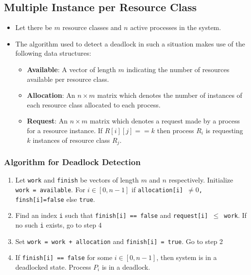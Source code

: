 \documentclass{article}
\theoremstyle{plain}
\theoremstyle{definition}
\begin{document}
\subsection{Multiple Instance per Resource Class}
\begin{itemize}
    \item Let there be $m$ resource classes and $n$ active processes in the system. 
    
    \item The algorithm used to detect a deadlock in such a situation makes use of the following data structures:
    \begin{itemize}
        \item \textbf{Available}: A vector of length $m$ indicating the number of resources available per resource class.
        
        \item \textbf{Allocation}: An $n \times m$ matrix which denotes the number of instances of each resource class allocated to each process. 
        
        \item \textbf{Request}: An $n \times m$ matrix which denotes a request made by a process for a resource instance. If $R[i][j] == k$ then process $R_i$ is requesting $k$ instances of resource class $R_j$. 
    \end{itemize}
\end{itemize}

\subsubsection{Algorithm for Deadlock Detection}
\begin{enumerate}
    \item Let \texttt{work} and \texttt{finish} be vectors of length $m$ and $n$ respectively. Initialize \texttt{work = available}. For $i \in \left[0, n-1\right]$ if \texttt{allocation[i] $\ne 0$,} \texttt{finsh[i]=false} else \texttt{true}.
    
    \item Find an index \texttt{i} such that \texttt{finish[i] == false} and \texttt{request[i] $\le$ work}. If no such \texttt{i} exists, go to step 4
    
    \item Set \texttt{work = work + allocation} and \texttt{finish[i] = true}. Go to step 2
    
    \item If \texttt{finish[i] == false} for some $i \in \left[0, n-1 \right]$, then system is in a deadlocked state. Process $P_i$ is in a deadlock. 
\end{enumerate}
\end{document}
